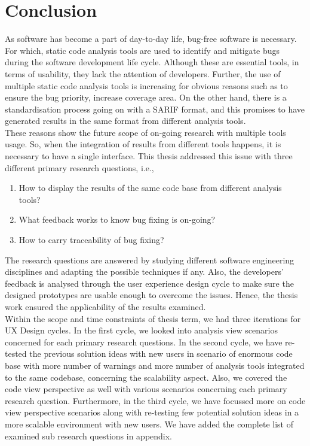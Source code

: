 \chapter{Conclusion}
\label{ch:conclusion_report}

As software has become a part of day-to-day life, bug-free software is necessary. For which, static code analysis tools are used to identify and mitigate bugs during the software development life cycle. Although these are essential tools, in terms of usability, they lack the attention of developers. Further, the use of multiple static code analysis tools is increasing for obvious reasons such as to ensure the bug priority, increase coverage area. On the other hand, there is a standardisation process going on with a SARIF format, \cite{sarif-git} and this promises to have generated results in the same format from different analysis tools. \\

These reasons show the future scope of on-going research with multiple tools usage. So, when the integration of results from different tools happens, it is necessary to have a single interface. This thesis addressed this issue with three different primary research questions, i.e., \\ 

\begin{enumerate}
\item  How to display the results of the same code base from different analysis tools?
\item  What feedback works to know bug fixing is on-going?
\item  How to carry traceability of bug fixing? \\
\end{enumerate}

The research questions are answered by studying different software engineering disciplines and adapting the possible techniques if any. Also, the developers’ feedback is analysed through the user experience design cycle to make sure the designed prototypes are usable enough to overcome the issues. Hence, the thesis work ensured the applicability of the results examined. \\

Within the scope and time constraints of thesis term, we had three iterations for UX Design cycles. In the first cycle, we looked into analysis view scenarios concerned for each primary research questions. In the second cycle, we have re-tested the previous solution ideas with new users in scenario of enormous code base with more number of warnings and more number of analysis tools integrated to the same codebase, concerning the scalability aspect. Also, we covered the code view perspective as well with various scenarios concerning each primary research question. Furthermore, in the third cycle, we have focussed more on code view perspective scenarios along with re-testing few potential solution ideas in a more scalable environment with new users. We have added the complete list of examined sub research questions in appendix.\\

